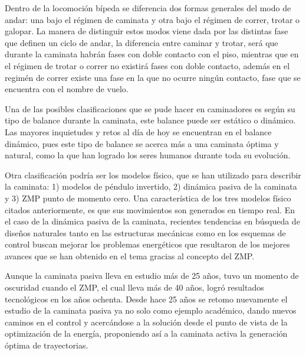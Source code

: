 Dentro de la locomoci\'on b\'ipeda se diferencia dos formas generales del modo de andar: una bajo el r\'egimen de caminata y otra bajo el r\'egimen de correr, trotar o galopar\cite{Geyer2006}. La manera de distinguir estos modos viene dada por las distintas fase que definen un ciclo de andar, la diferencia entre caminar y trotar, ser\'a que durante la caminata habr\'an fases con doble contacto con el piso, mientras que en el r\'egimen de trotar o correr no existirá fases con doble contacto\cite{Geyer2006}, adem\'as en el regim\'en de correr existe una fase en la que no ocurre ningún contacto, fase que se encuentra con el nombre de vuelo.\par
Una de las posibles clasificaciones que se pude hacer en caminadores es seg\'un su tipo de balance durante la caminata, este balance puede ser est\'atico o din\'amico\cite{Braunl2008}. Las mayores inquietudes y retos al d\'ia de hoy se encuentran en el balance din\'amico, pues este tipo de balance se acerca m\'as a una caminata \'optima y natural, como la que han logrado los seres humanos durante toda su evoluci\'on.\par
Otra clasificaci\'on podr\'ia ser los modelos físico, que se han utilizado para describir la caminata\cite{Xiang2010}: 1) modelos de p\'endulo invertido, 2) din\'amica pasiva de la caminata y 3) ZMP punto de momento cero. Una caracter\'istica de los tres modelos f\'isico citados anteriormente, es que sus movimientos son generados en tiempo real\cite{Xiang2010}. En el caso de la din\'amica pasiva de la caminata, recientes tendencias en b\'usqueda de dise\~nos naturales tanto en las estructuras mec\'anicas como en los esquemas de control buscan mejorar los problemas energ\'eticos que resultaron de los mejores avances que se han obtenido en el tema gracias al concepto del ZMP\cite{Xiang2010}.\par
Aunque la caminata pasiva lleva en estudio m\'as de 25 a\~nos, tuvo un momento de oscuridad cuando el ZMP, el cual lleva m\'as de 40 a\~nos, logr\'o resultados tecnol\'ogicos en los a\~nos ochenta\cite{Vukobratovic2004}. Desde hace 25 a\~nos se retomo nuevamente el estudio de la caminata pasiva ya no solo como ejemplo acad\'emico\cite{McGeer1990a}, dando nuevos caminos en el control y acerc\'andose a la soluci\'on desde el punto de vista de la optimizaci\'on de la energ\'ia\cite{Goswami1996}, proponiendo as\'i a la caminata activa la generaci\'on \'optima de trayectorias\cite{Gregg2010}.\par
